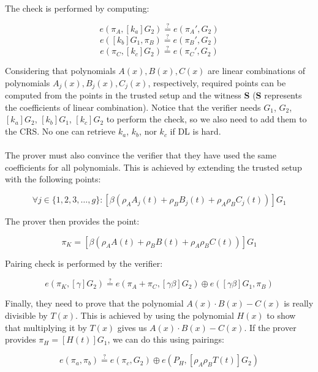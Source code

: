 \noindent The check is performed by computing:

$$ e(\pi_A, [k_a]G_2) \stackrel{?}{=} e(\pi_A', G_2) $$
$$ e([k_b]G_1, \pi_B) \stackrel{?}{=} e(\pi_B', G_2) $$
$$ e(\pi_C, [k_c]G_2) \stackrel{?}{=} e(\pi_C', G_2) $$

\noindent Considering that polynomials $A(x), B(x), C(x)$ are linear combinations of polynomials $A_j(x), B_j(x), C_j(x)$, respectively, required points can be computed from the points in the trusted setup and the witness \textbf{S} (\textbf{S} represents the coefficients of linear combination). Notice that the verifier needs $G_1$, $G_2$, $[k_a]G_2$, $[k_b]G_1$, $[k_c]G_2$ to perform the check, so we also need to add them to the CRS. No one can retrieve $k_a$, $k_b$, nor $k_c$ if DL is hard.\\
\\
The prover must also convince the verifier that they have used the same coefficients for all polynomials. This is achieved by extending the trusted setup with the following points:

$$\forall j \in \{1, 2, 3, \ldots, g\} : [\beta(\rho_A A_j(t) + \rho_B B_j(t) + \rho_A \rho_B C_j(t))]G_1 $$

\noindent The prover then provides the point:

$$ \pi_{K} = [\beta(\rho_A A(t) + \rho_B B(t) + \rho_A \rho_B C(t))]G_1 $$

\noindent Pairing check is performed by the verifier:

$$ e(\pi_K, [\gamma]G_2) \stackrel{?}{=} e(\pi_A + \pi_C, [\gamma\beta]G_2) \oplus e([\gamma\beta]G_1, \pi_B) $$

\noindent Finally, they need to prove that the polynomial $A(x) \cdot B(x) - C(x)$ is really divisible by $T(x)$. This is achieved by using the polynomial $H(x)$ to show that multiplying it by $T(x)$ gives us $A(x) \cdot B(x) - C(x)$. If the prover provides $\pi_H = [H(t)]G_1$, we can do this using pairings:

$$ e(\pi_a, \pi_b) \stackrel{?}{=} e(\pi_c, G_2) \oplus e(P_H, [\rho_A \rho_B T(t)]G_2) $$

